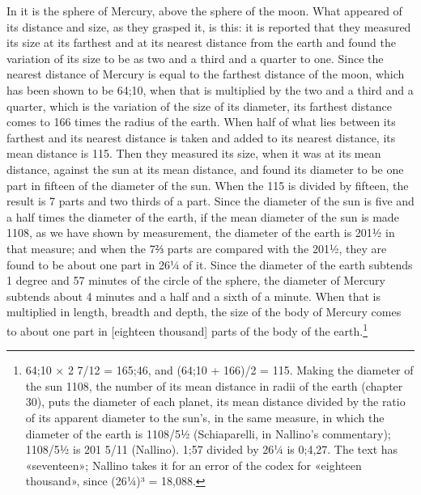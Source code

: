 \documentclass[11pt]{article}
\begin{document}
\par In it is the sphere of Mercury, above the sphere of the moon. What appeared of its distance and size, as they grasped it, is this: it is reported that they measured its size at its farthest and at its nearest distance from the earth and found the variation of its size to be as two and a third and a quarter to one. Since the nearest distance of Mercury is equal to the farthest distance of the moon, which has been shown to be 64;10, when that is multiplied by the two and a third and a quarter, which is the variation of the size of its diameter, its farthest distance comes to 166 times the radius of the earth. When half of what lies between its farthest and its nearest distance is taken and added to its nearest distance, its mean distance is 115. Then they measured its size, when it was at its mean distance, against the sun at its mean distance, and found its diameter to be one part in fifteen of the diameter of the sun. When the 115 is divided by fifteen, the result is 7 parts and two thirds of a part. Since the diameter of the sun is five and a half times the diameter of the earth, if the mean diameter of the sun is made 1108, as we have shown by measurement, the diameter of the earth is 201½ in that measure; and when the 7⅔ parts are compared with the 201½, they are found to be about one part in 26¼ of it. Since the diameter of the earth subtends 1 degree and 57 minutes of the circle of the sphere, the diameter of Mercury subtends about 4 minutes and a half and a sixth of a minute. When that is multiplied in length, breadth and depth, the size of the body of Mercury comes to about one part in [eighteen thousand] parts of the body of the earth.\footnote{64;10 × 2 7/12 = 165;46, and (64;10 + 166)/2 = 115. Making the diameter of the sun 1108, the number of its mean distance in radii of the earth (chapter 30), puts the diameter of each planet, its mean distance divided by the ratio of its apparent diameter to the sun's, in the same measure, in which the diameter of the earth is 1108/5½ (Schiaparelli, in Nallino's commentary); 1108/5½ is 201 5/11 (Nallino). 1;57 divided by 26¼ is 0;4,27. The text has «seventeen»; Nallino takes it for an error of the codex for «eighteen thousand», since (26¼)³ = 18,088.}\par
\end{document}
